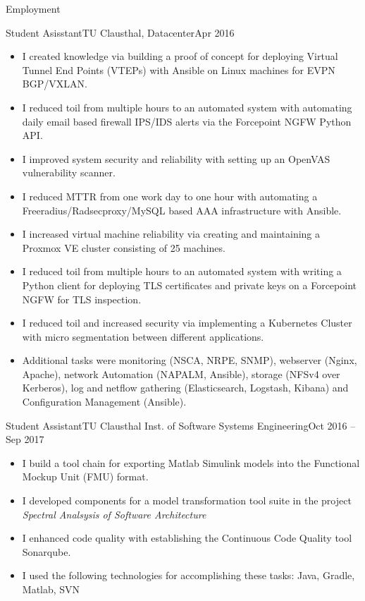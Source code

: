 \documentclass[]{mcdowellcv}
\begin{document}
\makeheader

\begin{cvsection}{Employment}
\begin{cvsubsection}{Student Asisstant}{TU Clausthal, Datacenter}{Apr 2016}

\begin{itemize}
\item I created knowledge via building a proof of concept for deploying Virtual Tunnel End Points (VTEPs) with Ansible on Linux machines for EVPN BGP/VXLAN.
\item I reduced toil from multiple hours to an automated system with automating daily email based firewall IPS/IDS alerts via the Forcepoint NGFW Python API.
\item I improved system security and reliability with setting up an OpenVAS vulnerability scanner.
\item I reduced MTTR from one work day to one hour with automating a Freeradius/Radsecproxy/MySQL based AAA infrastructure with Ansible.
\item I increased virtual machine reliability via creating and maintaining a Proxmox VE cluster consisting of 25 machines.
\item I reduced toil from multiple hours to an automated system with writing a Python client for deploying TLS certificates and private keys on a Forcepoint NGFW for TLS inspection.
\item I reduced toil and increased security via implementing a Kubernetes Cluster with micro segmentation between different applications.
\item Additional tasks were monitoring (NSCA, NRPE, SNMP), webserver (Nginx, Apache), network Automation (NAPALM, Ansible), storage (NFSv4 over Kerberos), log and netflow gathering (Elasticsearch, Logstash, Kibana) and Configuration Management (Ansible).
\end{itemize}
\end{cvsubsection}

\begin{cvsubsection}{Student Assistant}{TU Clausthal Inst. of Software Systems Engineering}{Oct 2016 -- Sep 2017}
\bigskip
\begin{itemize}
\item I build a tool chain for exporting Matlab Simulink models into the Functional Mockup Unit (FMU) format.
\item I developed components for a model transformation tool suite in the project \emph{Spectral Analsysis of Software Architecture}
\item I enhanced code quality with establishing the Continuous Code Quality tool Sonarqube.
\item I used the following technologies for accomplishing these tasks: Java, Gradle, Matlab, SVN
\end{itemize}
\end{cvsubsection}


\end{cvsection}
\end{document}

